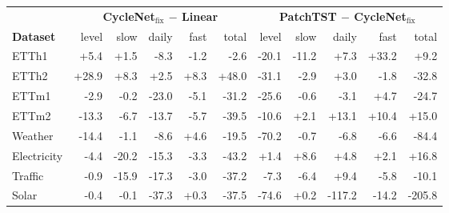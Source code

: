 \begin{tabular}{lrrrrrrrrrr}
\toprule
& \multicolumn{5}{c}{\textbf{CycleNet$_{\text{fix}}$ $-$ Linear}} & \multicolumn{5}{c}{\textbf{PatchTST $-$ CycleNet$_{\text{fix}}$}} \\
\cmidrule(lr){2-6} \cmidrule(lr){7-11}
\textbf{Dataset} & level & slow & daily & fast & total & level & slow & daily & fast & total \\
\midrule
ETTh1 & +5.4 & +1.5 & -8.3 & -1.2 & -2.6 & -20.1 & -11.2 & +7.3 & +33.2 & +9.2 \\
ETTh2 & +28.9 & +8.3 & +2.5 & +8.3 & +48.0 & -31.1 & -2.9 & +3.0 & -1.8 & -32.8 \\
ETTm1 & -2.9 & -0.2 & -23.0 & -5.1 & -31.2 & -25.6 & -0.6 & -3.1 & +4.7 & -24.7 \\
ETTm2 & -13.3 & -6.7 & -13.7 & -5.7 & -39.5 & -10.6 & +2.1 & +13.1 & +10.4 & +15.0 \\
Weather & -14.4 & -1.1 & -8.6 & +4.6 & -19.5 & -70.2 & -0.7 & -6.8 & -6.6 & -84.4 \\
Electricity & -4.4 & -20.2 & -15.3 & -3.3 & -43.2 & +1.4 & +8.6 & +4.8 & +2.1 & +16.8 \\
Traffic & -0.9 & -15.9 & -17.3 & -3.0 & -37.2 & -7.3 & -6.4 & +9.4 & -5.8 & -10.1 \\
Solar & -0.4 & -0.1 & -37.3 & +0.3 & -37.5 & -74.6 & +0.2 & -117.2 & -14.2 & -205.8 \\
\bottomrule
\end{tabular}
